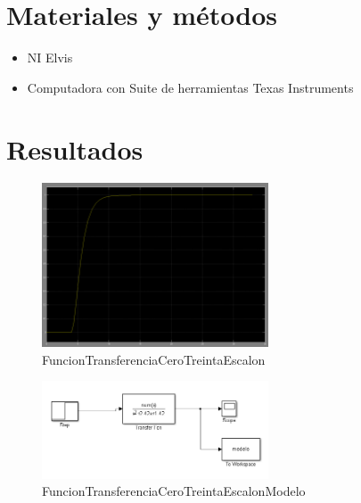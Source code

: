 \documentclass[]{article}
\begin{document}
\section{Materiales y métodos}

	\begin{itemize}
		\item NI Elvis
		\item Computadora con Suite de herramientas Texas Instruments
	\end{itemize}
	
\section{Resultados}


\begin{figure}[h!]
	\centering
	\includegraphics[width=0.6\textwidth]{Imagenes/FuncionTransferenciaCeroTreintaEscalon}
	\caption{FuncionTransferenciaCeroTreintaEscalon}
	\label{fig:FuncionTransferenciaCeroTreintaEscalon}
\end{figure}

\begin{figure}[h!]
	\centering
	\includegraphics[width=0.6\textwidth]{Imagenes/FuncionTransferenciaCeroTreintaEscalonModelo}
	\caption{FuncionTransferenciaCeroTreintaEscalonModelo}
	\label{fig:FuncionTransferenciaCeroTreintaEscalonModelo}
\end{figure}
\end{document}
